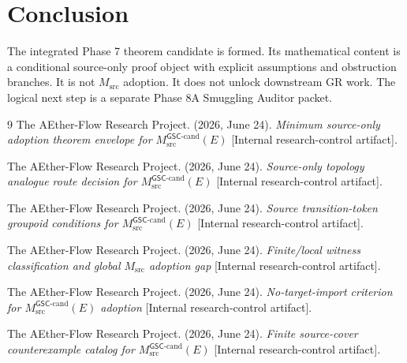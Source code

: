 \documentclass[11pt]{article}
\newcommand{\Msrc}{M_{\mathrm{src}}}
\begin{document}
\section{Conclusion}

The integrated Phase 7 theorem candidate is formed. Its mathematical content
is a conditional source-only proof object with explicit assumptions and
obstruction branches. It is not \(\Msrc\) adoption. It does not unlock
downstream GR work. The logical next step is a separate Phase 8A Smuggling
Auditor packet.

\begin{thebibliography}{9}
The AEther-Flow Research Project. (2026, June 24). \emph{Minimum source-only
adoption theorem envelope for \(M_{\mathrm{src}}^{\mathsf{GSC}\mbox{-}\mathrm{cand}}(E)\)}
[Internal research-control artifact].

The AEther-Flow Research Project. (2026, June 24). \emph{Source-only topology
analogue route decision for \(M_{\mathrm{src}}^{\mathsf{GSC}\mbox{-}\mathrm{cand}}(E)\)}
[Internal research-control artifact].

The AEther-Flow Research Project. (2026, June 24). \emph{Source
transition-token groupoid conditions for \(M_{\mathrm{src}}^{\mathsf{GSC}\mbox{-}\mathrm{cand}}(E)\)}
[Internal research-control artifact].

The AEther-Flow Research Project. (2026, June 24). \emph{Finite/local witness
classification and global \(M_{\mathrm{src}}\) adoption gap}
[Internal research-control artifact].

The AEther-Flow Research Project. (2026, June 24). \emph{No-target-import
criterion for \(M_{\mathrm{src}}^{\mathsf{GSC}\mbox{-}\mathrm{cand}}(E)\) adoption}
[Internal research-control artifact].

The AEther-Flow Research Project. (2026, June 24). \emph{Finite source-cover
counterexample catalog for \(M_{\mathrm{src}}^{\mathsf{GSC}\mbox{-}\mathrm{cand}}(E)\)}
[Internal research-control artifact].
\end{thebibliography}
\end{document}
